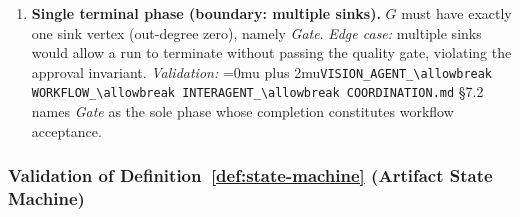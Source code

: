\documentclass[12pt]{article}
\theoremstyle{definition}
\DeclareRobustCommand{\code}[1]{\begingroup\Urlmuskip=0mu plus 2mu\relax\nolinkurl{#1}\endgroup}
\newcommand{\VisionFlow}{\code{VISION\_AGENT\_\allowbreak WORKFLOW\_\allowbreak INTERAGENT\_\allowbreak COORDINATION.md}}
\begin{document}
\begin{enumerate}[label=\textbf{W\arabic*.}, leftmargin=*, widest=W9]
  \item \textbf{Single terminal phase (boundary: multiple sinks).}
        $G$ must have exactly one sink vertex (out-degree zero), namely
        \textit{Gate}.
        \emph{Edge case:} multiple sinks would allow a run to terminate
        without passing the quality gate, violating the approval
        invariant.
        \emph{Validation:} \VisionFlow{} \S7.2 names \textit{Gate} as
        the sole phase whose completion constitutes workflow acceptance.

\end{enumerate}

\subsubsection{Validation of Definition~\ref{def:state-machine}
               (Artifact State Machine)}
\label{sec:val-state-machine}
\end{document}
